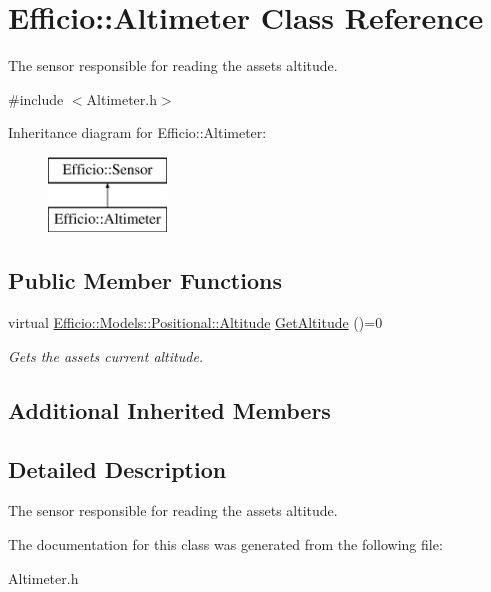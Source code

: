 \hypertarget{class_efficio_1_1_altimeter}{}\section{Efficio\+:\+:Altimeter Class Reference}
\label{class_efficio_1_1_altimeter}


The sensor responsible for reading the asset\textquotesingle{}s altitude.  




{\ttfamily \#include $<$Altimeter.\+h$>$}

Inheritance diagram for Efficio\+:\+:Altimeter\+:\begin{figure}[H]
\begin{center}
\leavevmode
\includegraphics[height=2.000000cm]{class_efficio_1_1_altimeter}
\end{center}
\end{figure}
\subsection*{Public Member Functions}
\begin{DoxyCompactItemize}
\item 
virtual \hyperlink{class_efficio_1_1_models_1_1_positional_1_1_altitude}{Efficio\+::\+Models\+::\+Positional\+::\+Altitude} \hyperlink{class_efficio_1_1_altimeter_a5f63ddf09415671de8ee09ac51716310}{Get\+Altitude} ()=0\hypertarget{class_efficio_1_1_altimeter_a5f63ddf09415671de8ee09ac51716310}{}\label{class_efficio_1_1_altimeter_a5f63ddf09415671de8ee09ac51716310}

\begin{DoxyCompactList}\small\item\em Gets the asset\textquotesingle{}s current altitude. \end{DoxyCompactList}\end{DoxyCompactItemize}
\subsection*{Additional Inherited Members}


\subsection{Detailed Description}
The sensor responsible for reading the asset\textquotesingle{}s altitude. 

The documentation for this class was generated from the following file\+:\begin{DoxyCompactItemize}
\item 
Altimeter.\+h\end{DoxyCompactItemize}
